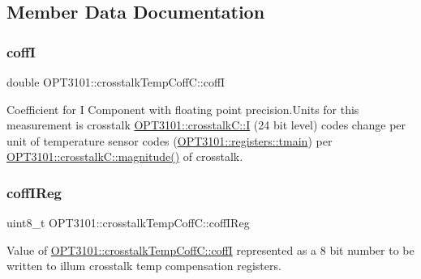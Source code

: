\subsection{Member Data Documentation}
\mbox{\label{class_o_p_t3101_1_1crosstalk_temp_coff_c_ae4687a0b6bdbea7cd4fa1581e5e9cf24}} 
\subsubsection{\texorpdfstring{coffI}{coffI}}
{\footnotesize\ttfamily double O\+P\+T3101\+::crosstalk\+Temp\+Coff\+C\+::coffI}



Coefficient for I Component with floating point precision.\+Units for this measurement is crosstalk \mbox{\hyperlink{class_o_p_t3101_1_1crosstalk_c_a97152b209288a0dc30c4158fdc1815fc}{O\+P\+T3101\+::crosstalk\+C\+::I}} (24 bit level) codes change per unit of temperature sensor codes (\mbox{\hyperlink{class_o_p_t3101_1_1registers_a3dfd8d81d4cb04d274007deb7c6122fc}{O\+P\+T3101\+::registers\+::tmain}}) per \mbox{\hyperlink{class_o_p_t3101_1_1crosstalk_c_a3f569027c07fb3fb49a02ae3108e34c1}{O\+P\+T3101\+::crosstalk\+C\+::magnitude()}} of crosstalk. 

\mbox{\label{class_o_p_t3101_1_1crosstalk_temp_coff_c_a28ab8d4219f159782b1af029bd876cac}} 
\subsubsection{\texorpdfstring{coff\+I\+Reg}{coffIReg}}
{\footnotesize\ttfamily uint8\+\_\+t O\+P\+T3101\+::crosstalk\+Temp\+Coff\+C\+::coff\+I\+Reg}



Value of \mbox{\hyperlink{class_o_p_t3101_1_1crosstalk_temp_coff_c_ae4687a0b6bdbea7cd4fa1581e5e9cf24}{O\+P\+T3101\+::crosstalk\+Temp\+Coff\+C\+::coffI}} represented as a 8 bit number to be written to illum crosstalk temp compensation registers. 

